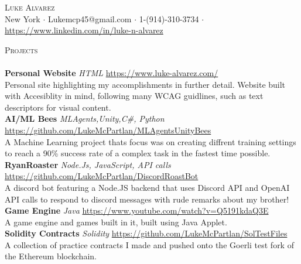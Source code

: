 \documentclass[a4paper]{article}
\newcommand{\lineunder} {
    \vspace*{-8pt} \\
    \hspace*{-18pt} \hrulefill \\
}
\newcommand{\header} [1] {
    {\hspace*{-18pt}\vspace*{6pt} \textsc{#1}}
    \vspace*{-6pt} \lineunder
}
\begin{document}
\vspace*{-40pt}

    

\vspace*{-10pt}
\begin{center}
	{\Huge \scshape {Luke Alvarez}}\\
	New York $\cdot$ Lukemcp45@gmail.com $\cdot$ 1-(914)-310-3734 $\cdot$ 
\href{https://www.linkedin.com/in/luke-n-alvarez}{https://www.linkedin.com/in/luke-n-alvarez} \\
\end{center}

\header{Projects}
{\textbf{Personal Website }}{\sl  HTML} \hfill \href{https://sites.google.com/view/luke-alvarez/home}{https://www.luke-alvarez.com/}\\
Personal site highlighting my accomplishments in further detail. Website built with Accesiblity in mind, following many WCAG guidlines, such as text descriptors for visual content.\\
\vspace*{2mm}
{\textbf{AI/ML Bees}} {\sl MLAgents,Unity,C\#, Python} \hfill
\href{https://github.com/LukeMcPartlan/MLAgentsUnityBees}{https://github.com/LukeMcPartlan/MLAgentsUnityBees}\\
A Machine Learning project thats focus was on creating diffrent training settings to reach a 90\% success rate of a complex task in the fastest time possible.\\
\vspace*{2mm}
{\textbf{RyanRoaster}} {\sl Node.Js, JavaScript, API calls} \hfill
\href{https://github.com/LukeMcPartlan/DiscordRoastBot}{https://github.com/LukeMcPartlan/DiscordRoastBot}\\
A discord bot featuring a Node.JS backend that uses Discord API and OpenAI API calls to respond to discord messages with rude remarks about my brother!\\
\vspace*{2mm}
{\textbf{Game Engine}} {\sl Java} \hfill \href{https://www.youtube.com/watch?v=Q5191kdaQ3E}{https://www.youtube.com/watch?v=Q5191kdaQ3E}\\
A game engine and games built in it, built using Java Applet.\\
\vspace*{2mm}
{\textbf{Solidity Contracts}} {\sl Solidity} \hfill \href{https://github.com/LukeMcPartlan/SolTestFiles}{https://github.com/LukeMcPartlan/SolTestFiles}\\
A collection of practice contracts I made and pushed onto the Goerli test fork of the Ethereum blockchain.\\
\vspace*{2mm}
\end{document}
